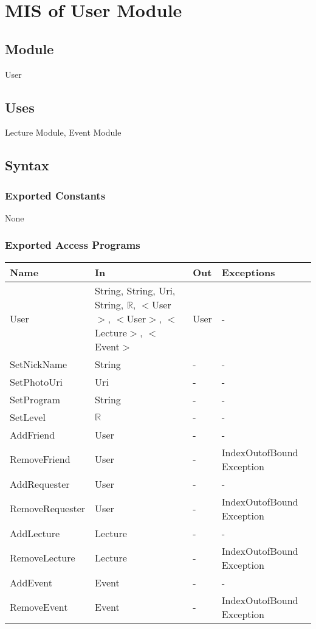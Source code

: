 \documentclass[12pt, titlepage]{article}
\begin{document}
\newpage

\section{MIS of User Module} \label{mUser}

\subsection{Module}

User

\subsection{Uses}

Lecture Module, Event Module

\subsection{Syntax}

\subsubsection{Exported Constants}
None

\subsubsection{Exported Access Programs}
\begin{center}
\begin{tabular}{p{4cm} p{2cm} p{4cm} p{4cm}}
\hline
\textbf{Name} & \textbf{In} & \textbf{Out} & \textbf{Exceptions} \\
\hline
User & String, String, Uri, String, $\mathbb{R}$, $<$User$>$, $<$User$>$, $<$Lecture$>$, $<$Event$>$ & User & -\\
SetNickName & String & - & -\\
SetPhotoUri & Uri & - & -\\
SetProgram & String & - & -\\
SetLevel & $\mathbb{R}$ & - & -\\
AddFriend & User & - & -\\
RemoveFriend & User & - & IndexOutofBound Exception\\
AddRequester & User & - & -\\
RemoveRequester & User & - & IndexOutofBound Exception\\
AddLecture & Lecture & - & -\\
RemoveLecture & Lecture & - & IndexOutofBound Exception\\
AddEvent & Event & - & -\\
RemoveEvent & Event & - & IndexOutofBound Exception\\
\hline
\end{tabular}
\end{center}
\end{document}
